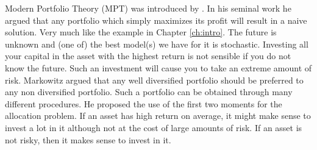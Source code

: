 \documentclass[oneside]{book}\usepackage{knitr}
\begin{document}
Modern Portfolio Theory (MPT) was introduced by \cite{markowitz1959portfolio}. 
In his seminal work he argued that any portfolio which simply maximizes its profit will result in a naive solution.
Very much like the example in Chapter \ref{ch:intro}. 
The future is unknown and (one of) the best model(s) we have for it is stochastic.
Investing all your capital in the asset with the highest return is not sensible if you do not know the future.
Such an investment will cause you to take an extreme amount of risk. 
Markowitz argued that any well diversified portfolio should be preferred to any non diversified portfolio. 
Such a portfolio can be obtained through many different procedures.
He proposed the use of the first two moments for the allocation problem.
If an asset has high return on average, it might make sense to invest a lot in it although not at the cost of large amounts of risk. 
If an asset is not risky, then it makes sense to invest in it.
\end{document}
